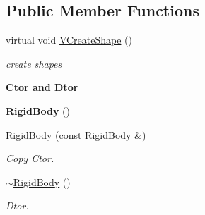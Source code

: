 \subsection*{Public Member Functions}
\begin{DoxyCompactItemize}
\item 
\hypertarget{classContent_1_1Actor_1_1Admin_1_1RigidBody_a4dcecdf7044c563a68c1da32ffa25a72}{
virtual void \hyperlink{classContent_1_1Actor_1_1Admin_1_1RigidBody_a4dcecdf7044c563a68c1da32ffa25a72}{VCreateShape} ()}
\label{classContent_1_1Actor_1_1Admin_1_1RigidBody_a4dcecdf7044c563a68c1da32ffa25a72}

\begin{DoxyCompactList}\small\item\em create shapes \item\end{DoxyCompactList}\end{DoxyCompactItemize}
\begin{Indent}{\bf Ctor and Dtor}\par
{\em \label{_amgrpad04e46909a047f9938f8e1fa1abe24a}
 }\begin{DoxyCompactItemize}
\item 
\hypertarget{classContent_1_1Actor_1_1Admin_1_1RigidBody_a6c648da86696544ef9d0bb42d80f57d3}{
{\bfseries RigidBody} ()}
\label{classContent_1_1Actor_1_1Admin_1_1RigidBody_a6c648da86696544ef9d0bb42d80f57d3}

\item 
\hypertarget{classContent_1_1Actor_1_1Admin_1_1RigidBody_a58a49666f93ec167b442435b90b7ab72}{
\hyperlink{classContent_1_1Actor_1_1Admin_1_1RigidBody_a58a49666f93ec167b442435b90b7ab72}{RigidBody} (const \hyperlink{classContent_1_1Actor_1_1Admin_1_1RigidBody}{RigidBody} \&)}
\label{classContent_1_1Actor_1_1Admin_1_1RigidBody_a58a49666f93ec167b442435b90b7ab72}

\begin{DoxyCompactList}\small\item\em Copy Ctor. \item\end{DoxyCompactList}\item 
\hypertarget{classContent_1_1Actor_1_1Admin_1_1RigidBody_a467504702b708cacb3cad858e4569e3e}{
\hyperlink{classContent_1_1Actor_1_1Admin_1_1RigidBody_a467504702b708cacb3cad858e4569e3e}{$\sim$RigidBody} ()}
\label{classContent_1_1Actor_1_1Admin_1_1RigidBody_a467504702b708cacb3cad858e4569e3e}

\begin{DoxyCompactList}\small\item\em Dtor. \item\end{DoxyCompactList}\end{DoxyCompactItemize}
\end{Indent}
